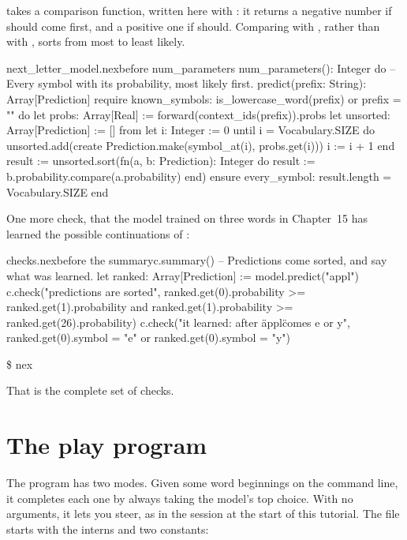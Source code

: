 \documentclass[11pt,a4paper,oneside,openany]{book}
\newcommand{\runoutput}[2]{%
  \begin{tcolorbox}[outbox]
  {\ttfamily\footnotesize\color{outfg}\$ nex \detokenize{#1}}\par\vspace{2pt}
  
  \end{tcolorbox}}
\newcommand{\code}[1]{\texttt{\detokenize{#1}}}
\begin{document}
\code{sort} takes a comparison function, written here with \code{fn}: it
returns a negative number if \code{a} should come first, and a positive
one if \code{b} should. Comparing \code{b} with \code{a}, rather than
\code{a} with \code{b}, sorts from most to least likely.

\begin{addbefore}{next_letter_model.nex}{before num_parameters}{  num_parameters(): Integer do}
  -- Every symbol with its probability, most likely first.
  predict(prefix: String): Array[Prediction]
  require
    known_symbols: is_lowercase_word(prefix) or prefix = ""
  do
    let probs: Array[Real] := forward(context_ids(prefix)).probs
    let unsorted: Array[Prediction] := []
    from
      let i: Integer := 0
    until
      i = Vocabulary.SIZE
    do
      unsorted.add(create Prediction.make(symbol_at(i), probs.get(i)))
      i := i + 1
    end
    result := unsorted.sort(fn(a, b: Prediction): Integer do
      result := b.probability.compare(a.probability)
    end)
  ensure
    every_symbol: result.length = Vocabulary.SIZE
  end
\end{addbefore}

One more check, that the model trained on three words in Chapter~15 has
learned the possible continuations of \code{appl}:

\begin{addbefore}{checks.nex}{before the summary}{c.summary()}
-- Predictions come sorted, and say what was learned.
let ranked: Array[Prediction] := model.predict("appl")
c.check("predictions are sorted", ranked.get(0).probability >= ranked.get(1).probability
  and ranked.get(1).probability >= ranked.get(26).probability)
c.check("it learned: after \"appl\" comes e or y",
  ranked.get(0).symbol = "e" or ranked.get(0).symbol = "y")
\end{addbefore}

\runoutput{checks.nex}{checks_final}

That is the complete set of checks.

\section{The play program}

The program has two modes. Given some word beginnings on the command
line, it completes each one by always taking the model's top choice. With
no arguments, it lets you steer, as in the session at the start of this
tutorial. The file starts with the interns and two constants:
\end{document}
